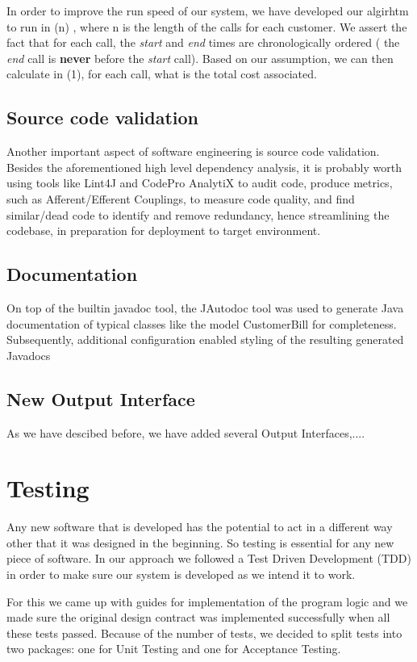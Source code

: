 \documentclass[11pt,twocolumn]{article} %
\begin{document}
In order to improve the run speed of our system, we have developed our algirhtm to run in \Theta(n)
, where n is the length of the calls for each customer. We assert the fact that for each call,
the \textit{start} and \textit{end} times are chronologically ordered ( the \textit{end} call is \textbf{never}
before the \textit{start} call). Based on our assumption, we can then calculate in \Theta(1), for each call,
what is the total cost associated. 

\subsection{Source code validation}
Another important aspect of software engineering is source code validation. Besides the
aforementioned high level dependency analysis, it is probably worth using tools like Lint4J
and CodePro AnalytiX to audit code, produce metrics, such as Afferent/Efferent Couplings, to measure code quality, and find similar/dead code to identify and remove redundancy, hence streamlining the codebase, in preparation for deployment to target environment.


\subsection{Documentation}
On top of the builtin javadoc tool, the JAutodoc tool was used to generate Java documentation of typical classes like the model CustomerBill for completeness.
Subsequently, additional configuration enabled styling of the resulting generated Javadocs

\subsection{New Output Interface}
As we have descibed before, we have added several Output Interfaces,....

\section{Testing}
Any new software that is developed has the potential to act in a different way other that it was designed in the beginning. So testing is essential for any new piece of software.
In our approach we followed a Test Driven Development (TDD) in order to make sure our system is developed as we intend it to work. 

For this we came up with guides for implementation of the program logic and we made sure the original design contract was implemented successfully when all these tests passed.            
Because of the number of tests, we decided to split tests into two packages: one for Unit Testing and one for Acceptance Testing.
\end{document}
